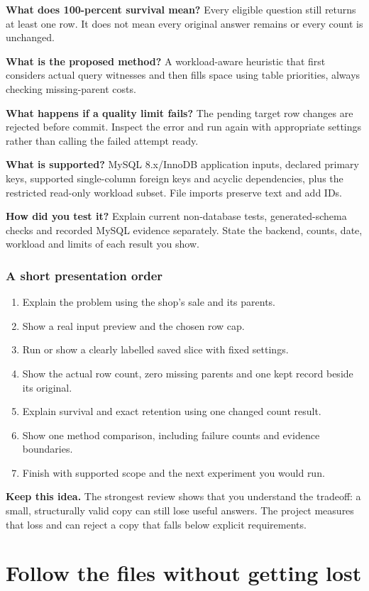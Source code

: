 \documentclass[12pt,a4paper,oneside]{report}
\newcommand{\reviewpoint}[1]{\par\begingroup\setlength{\fboxsep}{9pt}\noindent\colorbox{wash}{\parbox{\dimexpr\linewidth-18pt\relax}{\textbf{Keep this idea.} #1}}\endgroup\par}
\begin{document}
\textbf{What does 100-percent survival mean?} Every eligible question still returns at least one row. It does not mean every original answer remains or every count is unchanged.

\textbf{What is the proposed method?} A workload-aware heuristic that first considers actual query witnesses and then fills space using table priorities, always checking missing-parent costs.

\textbf{What happens if a quality limit fails?} The pending target row changes are rejected before commit. Inspect the error and run again with appropriate settings rather than calling the failed attempt ready.

\textbf{What is supported?} MySQL 8.x/InnoDB application inputs, declared primary keys, supported single-column foreign keys and acyclic dependencies, plus the restricted read-only workload subset. File imports preserve text and add IDs.

\textbf{How did you test it?} Explain current non-database tests, generated-schema checks and recorded MySQL evidence separately. State the backend, counts, date, workload and limits of each result you show.

\section{A short presentation order}
\begin{enumerate}
\item Explain the problem using the shop's sale and its parents.
\item Show a real input preview and the chosen row cap.
\item Run or show a clearly labelled saved slice with fixed settings.
\item Show the actual row count, zero missing parents and one kept record beside its original.
\item Explain survival and exact retention using one changed count result.
\item Show one method comparison, including failure counts and evidence boundaries.
\item Finish with supported scope and the next experiment you would run.
\end{enumerate}

\reviewpoint{The strongest review shows that you understand the tradeoff: a small, structurally valid copy can still lose useful answers. The project measures that loss and can reject a copy that falls below explicit requirements.}

\clearpage
\part*{Follow the files without getting lost}



\end{document}
